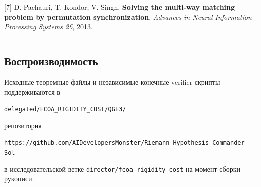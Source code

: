 {[}7{]} D. Pachauri, T. Kondor, V. Singh, \textbf{Solving the multi-way
matching problem by permutation synchronization}, \emph{Advances in
Neural Information Processing Systems 26}, 2013.

\begin{center}\rule{0.5\linewidth}{0.5pt}\end{center}

\hypertarget{ux432ux43eux441ux43fux440ux43eux438ux437ux432ux43eux434ux438ux43cux43eux441ux442ux44c}{%
\subsection{Воспроизводимость}\label{ux432ux43eux441ux43fux440ux43eux438ux437ux432ux43eux434ux438ux43cux43eux441ux442ux44c}}

Исходные теоремные файлы и независимые конечные verifier-скрипты
поддерживаются в

\texttt{delegated/FCOA\_RIGIDITY\_COST/QGE3/}

репозитория

\texttt{https://github.com/AIDevelopersMonster/Riemann-Hypothesis-Commander-Sol}

в исследовательской ветке \texttt{director/fcoa-rigidity-cost} на момент
сборки рукописи.
